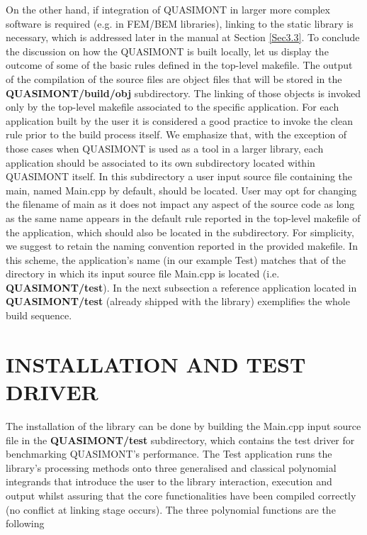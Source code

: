 \documentclass[a4paper, twosided]{book}
\begin{document}
\noindent
On the other hand, if integration of QUASIMONT in larger more complex software is required (e.g. in FEM/BEM libraries), linking to the static library is necessary, which is addressed later in the manual at Section \ref{Sec3.3}. To conclude the discussion on how the QUASIMONT is built locally, let us display the outcome of some of the basic rules defined in the top-level \colorbox{poliGrayBlue}{makefile}. The output of the compilation of the source files are object files that will be stored in the \colorbox{poliGrayBlue}{\textbf{QUASIMONT/build/obj}} subdirectory. The linking of those objects is invoked only by the top-level makefile associated to the specific application. For each application built by the user it is considered a good practice to invoke the \colorbox{poliGrayBlue}{clean} rule prior to the build process itself. We emphasize that, with the exception of those cases when QUASIMONT is used as a tool in a larger library, each application should be associated to its own subdirectory located within QUASIMONT itself. In this subdirectory a user input source file containing the \colorbox{poliGrayBlue}{main}, named \colorbox{poliGrayBlue}{Main.cpp} by default, should be located. User may opt for changing the filename of \colorbox{poliGrayBlue}{main} as it does not impact any aspect of the source code as long as the same name appears in the \colorbox{poliGrayBlue}{default} rule reported in the top-level \colorbox{poliGrayBlue}{makefile} of the application, which should also be located in the subdirectory. For simplicity, we suggest to retain the naming convention reported in the provided \colorbox{poliGrayBlue}{makefile}. In this scheme, the application's name (in our example \colorbox{poliGrayBlue}{Test}) matches that of the directory in which its input source file \colorbox{poliGrayBlue}{Main.cpp} is located (i.e. \colorbox{poliGrayBlue}{\textbf{QUASIMONT/test}}). In the next subsection a reference application located in  \colorbox{poliGrayBlue}{\textbf{QUASIMONT/test}} (already shipped with the library) exemplifies the whole build sequence.

\section[Installation and test driver]{\changefont INSTALLATION AND TEST DRIVER}\label{Sec2.4}

\noindent
The installation of the library can be done by building the \colorbox{poliGrayBlue}{Main.cpp} input source file in the \colorbox{poliGrayBlue}{\textbf{QUASIMONT/test}} subdirectory, which contains the test driver for benchmarking QUASIMONT's performance. The \colorbox{poliGrayBlue}{Test} application  runs the library's processing methods onto three generalised and classical polynomial integrands that introduce the user to the library interaction, execution and output whilst assuring that the core functionalities have been compiled correctly (no conflict at linking stage occurs). The three polynomial functions are the following
\end{document}
